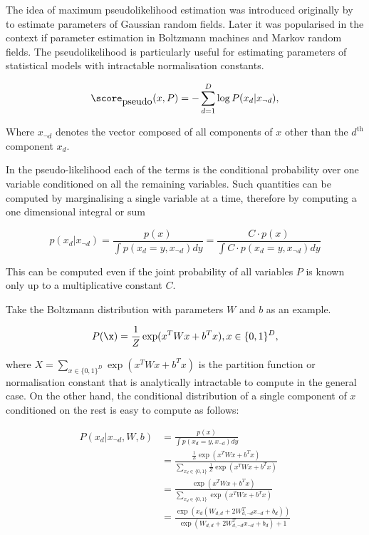 The idea of maximum pseudolikelihood estimation was introduced originally by \cite{Besag1977} to estimate parameters of Gaussian random fields. Later it was popularised in the context if parameter estimation in Boltzmann machines \cite{Hyvarinnen} and Markov random fields. The pseudolikelihood is particularly useful for estimating parameters of statistical models with intractable normalisation constants.

\begin{equation}
	\score_{\mbox{pseudo}}(x,P) = - \sum_{d=1}^{D} \log P(x_d\vert x_{\neg d}),
\end{equation}

Where $x_{\neg d}$ denotes the vector composed of all components of $x$ other than the $d^{\mbox{th}}$ component $x_d$. 

In the pseudo-likelihood each of the terms is the conditional probability over one variable conditioned on all the remaining variables. Such quantities can be computed by marginalising a single variable at a time, therefore by computing a one dimensional integral or sum

\begin{equation}
	p(x_d\vert x_{\neg d}) = \frac{p(x)}{\int p(x_d=y,x_{\neg d}) dy} = \frac{C \cdot p(x)}{\int C \cdot p(x_d=y,x_{\neg d}) dy}
\end{equation}

This can be computed even if the joint probability of all variables $P$ is known only up to a multiplicative constant $C$.

Take the Boltzmann distribution with parameters $W$ and $b$ as an example. 

\begin{equation}
	P(\x) = \frac{1}{Z}\exp(x^{T}Wx + b^{T}x), x\in\{0,1\}^D,
\end{equation}

where $X = \sum_{x\in\{0,1\}^D}\exp(x^{T}Wx + b^{T}x)$ is the partition function or normalisation constant that is analytically intractable to compute in the general case. On the other hand, the conditional distribution of a single component of $x$ conditioned on the rest is easy to compute as follows:

\begin{align}
	P(x_d\vert x_{\neg d}, W, b) &= \frac{p(x)}{\int p(x_d=y,x_{\neg d}) dy}\\
		&= \frac{\frac{1}{Z}\exp(x^{T}Wx + b^{T}x)}{\sum_{x_d\in\{0,1\}}\frac{1}{Z}\exp(x^{T}Wx + b^{T}x)}\\
		&= \frac{\exp(x^{T}Wx + b^{T}x)}{\sum_{x_d\in\{0,1\}}\exp(x^{T}Wx + b^{T}x)}\\
		&= \frac{\exp\left( x_d \left( W_{d,d} + 2 W_{d,\neg d}^{T}x_{\neg d} + b_d \right)\right)}{\exp( W_{d,d} + 2 W_{d,\neg d}^{T}x_{\neg d} + b_{d}) + 1}\\
\end{align}

